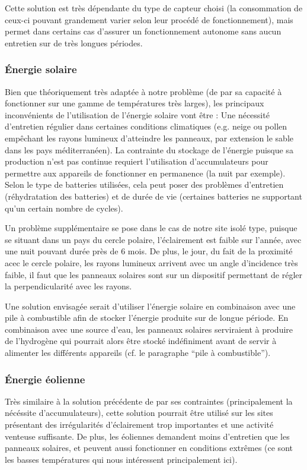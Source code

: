 Cette solution est très dépendante du type de capteur choisi (la consommation de ceux-ci pouvant grandement varier selon leur procédé de fonctionnement), mais permet dans certains cas d’assurer un fonctionnement autonome sans aucun entretien sur de très longues périodes.

\subsubsection{Énergie solaire}

Bien que théoriquement très adaptée à notre problème (de par sa capacité à fonctionner sur une gamme de températures très larges), les principaux inconvénients de l’utilisation de l’énergie solaire vont être :
Une nécessité d’entretien régulier dans certaines conditions climatiques (e.g. neige ou pollen empêchant les rayons lumineux d’atteindre les panneaux, par extension le sable dans les pays méditerranéen).
La contrainte du stockage de l’énergie puisque sa production n’est pas continue requiert l’utilisation d’accumulateurs pour permettre aux appareils de fonctionner en permanence (la nuit par exemple). Selon le type de batteries utilisées, cela peut poser des problèmes d’entretien (réhydratation des batteries) et de durée de vie (certaines batteries ne supportant qu’un certain nombre de cycles).

Un problème supplémentaire se pose dans le cas de notre site isolé type, puisque se situant dans un pays du cercle polaire, l’éclairement est faible sur l'année, avec une nuit pouvant durée près de 6 mois. De plus, le jour, du fait de la proximité acec le cercle polaire, les rayons lumineux arrivent avec un angle d'incidence très faible, il faut que les panneaux solaires sont sur un dispositif permettant de régler la perpendicularité avec les rayons.

Une solution envisagée serait d’utiliser l’énergie solaire en combinaison avec une pile à combustible afin de stocker l’énergie produite sur de longue période. En combinaison avec une source d’eau, les panneaux solaires serviraient à produire de l’hydrogène qui pourrait alors être stocké indéfiniment avant de servir à alimenter les différents appareils (cf. le paragraphe “pile à combustible”).

\subsubsection{Énergie éolienne}

Très similaire à la solution précédente de par ses contraintes (principalement la nécéssite d’accumulateurs), cette solution pourrait être utilisé sur les sites présentant des irrégularités d’éclairement trop importantes et une activité venteuse suffisante. De plus, les éoliennes demandent moins d’entretien que les panneaux solaires, et peuvent aussi fonctionner en conditions extrêmes (ce sont les basses températures qui nous intéressent principalement ici).

